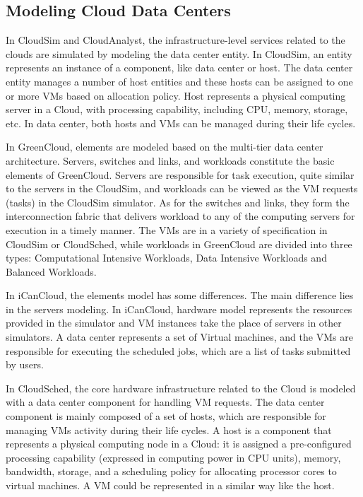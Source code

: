 \documentclass[3p, twocolumn]{elsarticle}
\begin{document}
\subsection{Modeling Cloud Data Centers}
In CloudSim and CloudAnalyst, the infrastructure-level services related to the clouds are simulated by modeling the data center entity. In CloudSim, an entity represents an instance of a component, like data center or host. The data center entity manages a number of host entities and these hosts can be assigned to one or more VMs based on allocation policy. Host represents a physical computing server in a Cloud, with processing capability, including CPU, memory, storage, etc. In data center, both hosts and VMs can be managed during their life cycles.

In GreenCloud, elements are modeled based on the multi-tier data center architecture. Servers, switches and links, and workloads constitute the basic elements of GreenCloud. Servers are responsible for task execution, quite similar to the servers in the CloudSim, and workloads can be viewed as the VM requests (tasks) in the CloudSim simulator. As for the switches and links, they form the interconnection fabric that delivers workload to any of the computing servers for execution in a timely manner. The VMs are in a variety of specification in CloudSim or CloudSched, while workloads in GreenCloud are divided into three types: Computational Intensive Workloads, Data Intensive Workloads and Balanced Workloads.

In iCanCloud, the elements model has some differences. The main difference lies in the servers modeling. In iCanCloud, hardware model represents the resources provided in the simulator and VM instances take the place of servers in other simulators. A data center represents a set of Virtual machines, and the VMs are responsible for executing the scheduled jobs, which are a list of tasks submitted by users.

In CloudSched, the core hardware infrastructure related to the Cloud is modeled with a data center component for handling VM requests. The data center component is mainly composed of a set of hosts, which are responsible for managing VMs activity during their life cycles. A host is a component that represents a physical computing node in a Cloud: it is assigned a pre-configured processing capability (expressed in computing power in CPU units), memory, bandwidth, storage, and a scheduling policy for allocating processor cores to virtual machines. A VM could be represented in a similar way like the host.
\end{document}
